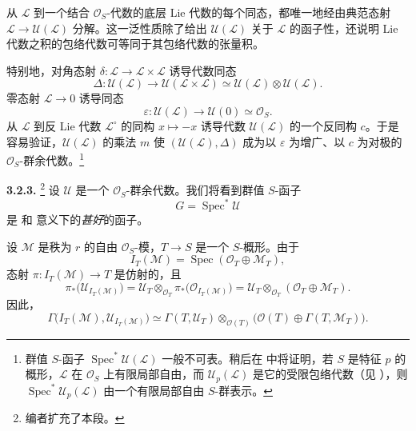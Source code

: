 从 \(\mathcal L\) 到一个结合 \(\mathcal O_S\)-代数的底层 Lie 代数的每个同态，都唯一地经由典范态射 \(\mathcal L\to\mathcal U(\mathcal L)\) 分解。这一泛性质除了给出 \(\mathcal U(\mathcal L)\) 关于 \(\mathcal L\) 的函子性，还说明 Lie 代数之积的包络代数可等同于其包络代数的张量积。

特别地，对角态射 \(\delta:\mathcal L\to\mathcal L\times\mathcal L\) 诱导代数同态
\[
  \Delta:\mathcal U(\mathcal L)\longrightarrow
  \mathcal U(\mathcal L\times\mathcal L)
  \simeq
  \mathcal U(\mathcal L)\otimes\mathcal U(\mathcal L).
\]
零态射 \(\mathcal L\to0\) 诱导同态
\[
  \varepsilon:\mathcal U(\mathcal L)\longrightarrow
  \mathcal U(0)\simeq\mathcal O_S.
\]
从 \(\mathcal L\) 到反 Lie 代数 \(\mathcal L^{\circ}\) 的同构 \(x\mapsto-x\) 诱导代数 \(\mathcal U(\mathcal L)\) 的一个反同构 \(c\)。于是容易验证，\(\mathcal U(\mathcal L)\) 的乘法 \(m\) 使 \((\mathcal U(\mathcal L),\Delta)\) 成为以 \(\varepsilon\) 为增广、以 \(c\) 为对极的 \(\mathcal O_S\)-群余代数。\footnote{群值 \(S\)-函子 \(\operatorname{Spec}^{*}\mathcal U(\mathcal L)\) 一般不可表。稍后在  中将证明，若 \(S\) 是特征 \(p\) 的概形，\(\mathcal L\) 在 \(\mathcal O_S\) 上有限局部自由，而 \(\mathcal U_p(\mathcal L)\) 是它的受限包络代数（见 ），则 \(\operatorname{Spec}^{*}\mathcal U_p(\mathcal L)\) 由一个有限局部自由 \(S\)-群表示。}

\medskip
\noindent\textbf{3.2.3.}
\label{sga3:VIIA:3.2.3}
\footnote{编者扩充了本段。}
设 \(\mathcal U\) 是一个 \(\mathcal O_S\)-群余代数。我们将看到群值 \(S\)-函子
\[
  G=\operatorname{Spec}^{*}\mathcal U
\]
是 和  意义下的\emph{甚好}的函子。

设 \(\mathcal M\) 是秩为 \(r\) 的自由 \(\mathcal O_S\)-模，\(T\to S\) 是一个 \(S\)-概形。由于
\[
  I_T(\mathcal M)=
  \operatorname{Spec}(\mathcal O_T\oplus\mathcal M_T),
\]
态射 \(\pi:I_T(\mathcal M)\to T\) 是仿射的，且
\[
  \pi_{*}\bigl(\mathcal U_{I_T(\mathcal M)}\bigr)
  =
  \mathcal U_T\otimes_{\mathcal O_T}
  \pi_{*}\bigl(\mathcal O_{I_T(\mathcal M)}\bigr)
  =
  \mathcal U_T\otimes_{\mathcal O_T}
  (\mathcal O_T\oplus\mathcal M_T).
\]
因此，
\begin{equation}
  \Gamma\bigl(I_T(\mathcal M),\mathcal U_{I_T(\mathcal M)}\bigr)
  \simeq
  \Gamma(T,\mathcal U_T)\otimes_{\mathcal O(T)}
  \bigl(\mathcal O(T)\oplus\Gamma(T,\mathcal M_T)\bigr).
  \tag{1}
  \label{sga3:VIIA:3.2.3-eq1}
\end{equation}


